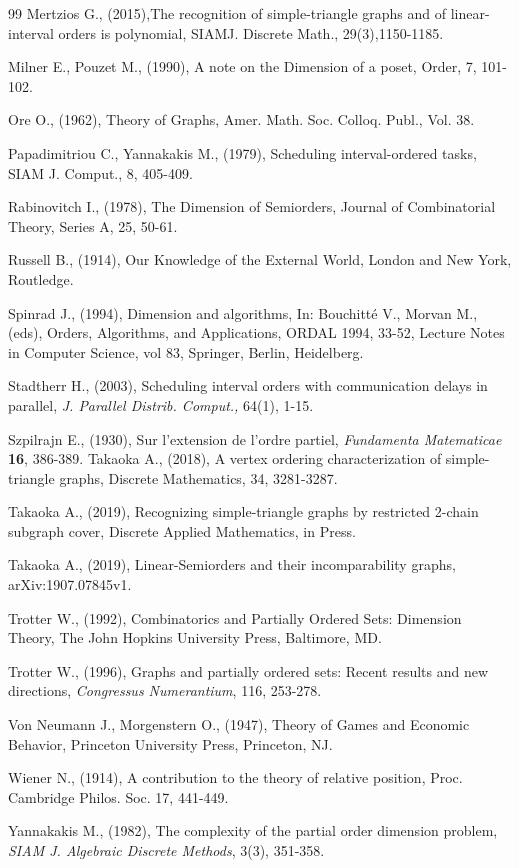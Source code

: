 \documentclass{article}
\theoremstyle{definition}
\begin{document}
\begin{thebibliography}{99}
Mertzios G., (2015),The recognition of simple-triangle graphs and of linear-interval orders is polynomial, SIAMJ. Discrete Math., 29(3),1150-1185.

 Milner E., Pouzet M., (1990), A note on the Dimension of a poset, Order, 7, 101-102.



 Ore O., (1962), Theory of Graphs, Amer. Math. Soc. Colloq. Publ., Vol. 38.



Papadimitriou C., Yannakakis M., (1979), Scheduling interval-ordered tasks, SIAM J. Comput., 
8, 405-409.

Rabinovitch I., (1978), The Dimension of Semiorders, Journal of Combinatorial Theory, Series A, 25, 50-61.

 


Russell B., (1914), Our Knowledge of the External World, London and New York, Routledge.





 Spinrad J., (1994), Dimension and algorithms, In: Bouchitté V., Morvan M., (eds), Orders, Algorithms, and Applications, ORDAL 1994, 33-52, Lecture Notes in Computer Science, vol 83, Springer, Berlin, Heidelberg.

Stadtherr H., (2003), Scheduling interval orders with communication delays in parallel, {\it 
J. Parallel Distrib. Comput.,} 64(1), 1-15.


 Szpilrajn E., (1930), Sur l'extension de l'ordre partiel, {\it Fundamenta Matematicae} {\bf 16}, 386-389.
 Takaoka A., (2018),
A vertex ordering characterization of simple-triangle graphs, Discrete Mathematics, 34, 3281-3287.

 Takaoka A., (2019),
Recognizing simple-triangle graphs by restricted 2-chain subgraph cover, Discrete Applied Mathematics, in Press.


 Takaoka A., (2019), Linear-Semiorders and their incomparability graphs, 
arXiv:1907.07845v1.

 Trotter W., (1992), Combinatorics and Partially Ordered Sets: Dimension Theory, 
The
John Hopkins University Press, Baltimore, MD.

 Trotter W., (1996), Graphs and partially ordered sets: Recent results and new directions, 
{\it Congressus Numerantium}, 116, 253-278.

Von Neumann J., Morgenstern O., (1947), Theory of Games and Economic Behavior, Princeton University Press, Princeton, NJ.


Wiener N., (1914), A contribution to the theory of relative position, Proc. Cambridge Philos. Soc. 17, 441-449.



Yannakakis M., (1982), The complexity of the partial order dimension problem, {\it SIAM J. Algebraic Discrete Methods}, 3(3), 351-358.


\end{thebibliography}
\end{document}
